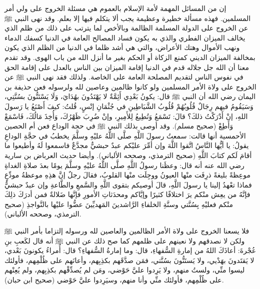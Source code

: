 إن من المسائل المهمة لأمة الإسلام بالعموم هي مسئلة الخروج على ولي أمر المسلمين. فهذه مسألة خطيرة وعظيمة يجب ألا يتكلم فيها إلا بعلم. 
وقد نهى النبي ﷺ عن الخروج على الدولة المسلمة الظالمة وبالأخص لما يترتب على ذلك من ظلم الذي يخالف الميزان الفطري والذي به يكون فساد المصالح العامة في الدنيا كسفك الدماء ونهب الأموال وهتك الأعراض، والتي هي أشد ظلما في الدنيا من الظلم الذي يكون بمخالفة الميزان الديني كمنع الزكاة أو الحكم بغير ما أنزل الله من باب الهوى. وقد تقدم معنا أن الله جل جلاله قدم في الدنيا إقامة الميزان بين الناس بالعدل على إقامة الحق في نفوس الناس لتقديم المصلحة العامة على الخاصة. ولذلك فقد نهى النبي ﷺ عن الخروج على ولاة الأمر المسلمين ولو كانوا ظالمين وعاصين لله ولرسوله فعن حذيفة بن اليمان رضي الله أن النبي ﷺ قال: يكونُ بَعْدِي أَئِمَّةٌ لا يَهْتَدُونَ بهُدَايَ، وَلَا يَسْتَنُّونَ بسُنَّتِي، وَسَيَقُومُ فيهم رِجَالٌ قُلُوبُهُمْ قُلُوبُ الشَّيَاطِينِ في جُثْمَانِ إنْسٍ، قُلتُ: كيفَ أَصْنَعُ يا رَسولَ اللهِ، إنْ أَدْرَكْتُ ذلكَ؟ قالَ: تَسْمَعُ وَتُطِيعُ لِلأَمِيرِ، وإنْ ضُرِبَ ظَهْرُكَ، وَأُخِذَ مَالُكَ، فَاسْمَعْ وَأَطِعْ {\footnotesize (صحيح مسلم)}. وقد أوصى بذلك النبي ﷺ في حجة الوداع فعن أم الحصين الأحمسية أنها قالت: سمعتُ رسولَ اللَّهِ صلَّى اللَّهُ عليْهِ وسلَّمَ يخطبُ في حجَّةِ الوداعِ   يقولُ: يا أيُّها النَّاسُ اتَّقوا اللَّهَ وإن أمِّرَ عليْكم عبدٌ حبشيٌّ مجدَّعٌ فاسمعوا لَهُ وأطيعوا ما أقامَ لَكم كتابَ اللَّهِ  {\footnotesize (صحيح الترمذي، وصححه الألباني)}. وأيضا حديث العرباض بن سارية رضي الله عنه أنه قال: وعظَنا رسولُ اللَّهِ صلَّى اللَّهُ عليْهِ وسلَّمَ يومًا بعدَ صلاةِ الغداةِ موعِظةً بليغةً ذرِفَت منْها العيونُ ووجِلَت منْها القلوبُ، فقالَ رجلٌ إنَّ هذِهِ موعظةُ مودِّعٍ فماذا تعْهدُ إلينا يا رسولَ اللَّهِ، قالَ أوصيكم بتقوى اللَّهِ والسَّمعِ والطَّاعةِ وإن عبدٌ حبشيٌّ فإنَّهُ من يعِش منْكم يرَ اختلافًا كثيرًا وإيَّاكم ومحدَثاتِ الأمورِ فإنَّها ضَلالةٌ فمن أدرَكَ ذلِكَ منْكم فعليْهِ بِسُنَّتي وسنَّةِ الخلفاءِ الرَّاشدينَ المَهديِّينَ عضُّوا عليْها بالنَّواجذِ {\footnotesize (صحيح الترمذي، وصححه الألباني)}.

فلا يسعنا الخروج على ولاة الأمر الظالمين والعاصين لله ورسوله إلتزاما بأمر النبي ﷺ ولكن لا نصدقهم ولا نعينهم على ظلمهم كما صح ذلك عن النبي ﷺ أنه قال لكَعبِ بنِ عُجْرةَ: أعاذَكَ اللهُ من إمارةِ السُّفهاءِ، قال: وما إمارةُ السُّفهاءِ؟ قال: أُمراءُ يكونونَ بَعْدي، لا يَقتَدونَ بهَدْيي، ولا يَستَنُّونَ بسُنَّتي، فمَن صدَّقَهم بكذِبِهم، وأعانَهم على ظُلْمِهم، فأولئك ليسوا منِّي، ولستُ منهم، ولا يَرِدوا عليَّ حَوْضي، ومَن لم يُصدِّقْهم بكذِبِهم، ولم يُعِنْهم على ظُلْمِهم، فأولئك منِّي وأنا منهم، وسيَرِدوا عليَّ حَوْضي {\footnotesize (صحيح ابن حبان)}.

